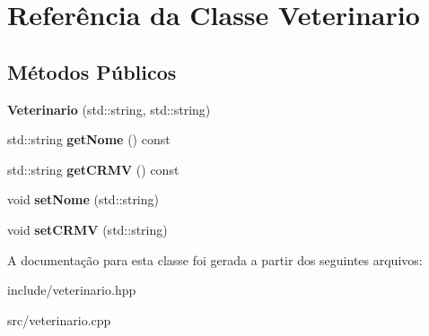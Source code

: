 \hypertarget{classVeterinario}{}\section{Referência da Classe Veterinario}
\label{classVeterinario}
\subsection*{Métodos Públicos}
\begin{DoxyCompactItemize}
\item 
\mbox{\label{classVeterinario_aab67367dea0da681c1f73bfe4f4943e4}} 
{\bfseries Veterinario} (std\+::string, std\+::string)
\item 
\mbox{\label{classVeterinario_aff1c346dd4004bbe48f2b2da9ce1a0fc}} 
std\+::string {\bfseries get\+Nome} () const
\item 
\mbox{\label{classVeterinario_a5c5f68a79464bc9316fc835b05772160}} 
std\+::string {\bfseries get\+C\+R\+MV} () const
\item 
\mbox{\label{classVeterinario_a12db815ce9621b106dbf94b96ecef311}} 
void {\bfseries set\+Nome} (std\+::string)
\item 
\mbox{\label{classVeterinario_aa316acc3cee917bdef76a299e2f90dd7}} 
void {\bfseries set\+C\+R\+MV} (std\+::string)
\end{DoxyCompactItemize}


A documentação para esta classe foi gerada a partir dos seguintes arquivos\+:\begin{DoxyCompactItemize}
\item 
include/veterinario.\+hpp\item 
src/veterinario.\+cpp\end{DoxyCompactItemize}
